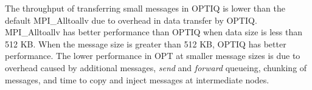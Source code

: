 The throughput of transferring small messages in OPTIQ is lower than the default MPI\_Alltoallv due to overhead in data transfer by OPTIQ. MPI\_Alltoallv has better performance than OPTIQ when data size is less than 512 KB. 
When the message size is greater than 512 KB, OPTIQ has better performance. The lower performance in OPT at smaller message sizes is due to overhead caused by additional messages, {\em send} and {\em forward} queueing, chunking of messages, and time to copy and inject messages at intermediate nodes.
